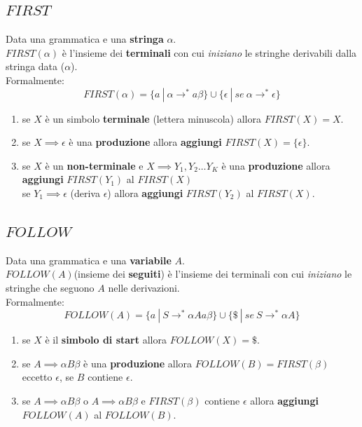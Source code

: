 \documentclass[12pt]{article}
\begin{document}
\subsection{$FIRST$}
Data una grammatica e una \textbf{stringa} $\alpha$.\\
$FIRST(\alpha)$ è l'insieme dei \textbf{terminali} con cui \textit{iniziano} le stringhe derivabili dalla stringa data ($\alpha$).\\
Formalmente:
\begin{equation*}
    FIRST(\alpha) = \{a\ |\ \alpha \rightarrow^*a\beta\} \cup \{\epsilon\ |\ se\  \alpha \rightarrow^*\epsilon\}
\end{equation*}
\begin{enumerate}
    \item se $X$ è un simbolo \textbf{terminale} (lettera minuscola) allora $FIRST(X)=X$.
    \item se $X \implies \epsilon$ è una \textbf{produzione} allora \textbf{aggiungi} $FIRST(X)=\{\epsilon\}$.
    \item se $X$ è un \textbf{non-terminale} e $X \implies Y_1,Y_2\dots Y_K$ è una \textbf{produzione} allora \textbf{aggiungi} $FIRST(Y_1)$ al $FIRST(X)$\\
            se $Y_1 \implies \epsilon$ (deriva $\epsilon$) allora \textbf{aggiungi} $FIRST(Y_2)$ al $FIRST(X)$.
\end{enumerate}

\subsection{$FOLLOW$}
Data una grammatica e una \textbf{variabile} $A$.\\
$FOLLOW(A)$(insieme dei \textbf{seguiti}) è l'insieme dei terminali con cui \textit{iniziano} le stringhe che seguono $A$ nelle derivazioni.\\
Formalmente:
\begin{equation*}
    FOLLOW(A)=\{a\ |\ S \rightarrow^* \alpha Aa\beta\} \cup \{\$\ |\ se\ S \rightarrow^*\alpha A\}
\end{equation*}
\begin{enumerate}
    \item se $X$ è il \textbf{simbolo di start} allora $FOLLOW(X)=\$$.
    \item se $A \implies \alpha B \beta$ è una \textbf{produzione} allora $FOLLOW(B)=FIRST(\beta)$ eccetto $\epsilon$, se $B$ contiene $\epsilon$.
    \item se $A \implies \alpha B \beta$ o $A \implies \alpha B \beta$ e $FIRST(\beta)$ contiene $\epsilon$ allora \textbf{aggiungi} $FOLLOW(A)$ al $FOLLOW(B)$.
\end{enumerate}
\end{document}
